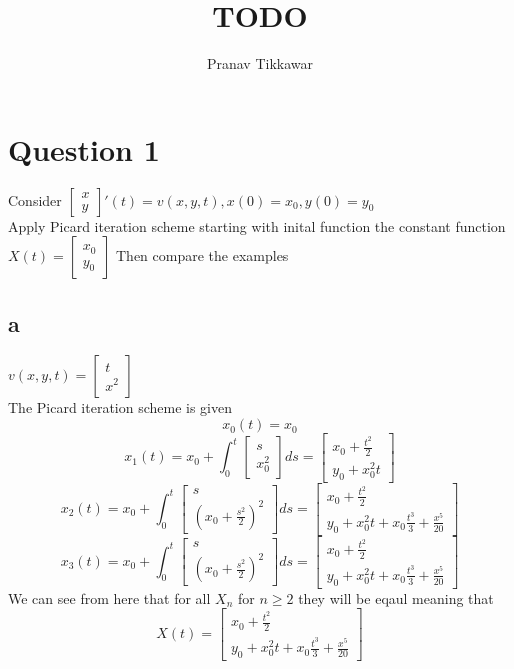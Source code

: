 \documentclass{article}
\author{Pranav Tikkawar}
\title{TODO}
\begin{document}
\maketitle
\section*{Question 1}
Consider $\begin{bmatrix}
    x \\
    y
\end{bmatrix}'(t) = v(x,y,t), x(0)=x_0, y(0) = y_0$ \\
Apply Picard iteration scheme starting with inital function the constant function $X(t) = \begin{bmatrix}
    x_0 \\
    y_0
\end{bmatrix}$ Then compare the examples
\subsection*{a}
$v(x,y,t) = \begin{bmatrix}
    t\\
    x^2
\end{bmatrix}$\\
The Picard iteration scheme is given 
$$x_0(t) = x_0$$
$$x_1(t) = x_0 + \int_0^t \begin{bmatrix}
    s\\
    x_0^2
\end{bmatrix} ds = \begin{bmatrix}
    x_0 + \frac{t^2}{2} \\
    y_0 + x_0^2t
\end{bmatrix}$$
$$x_2(t) = x_0 + \int_0^t \begin{bmatrix}
    s \\
    (x_0 + \frac{s^2}{2})^2
\end{bmatrix} ds = \begin{bmatrix}
    x_0 + \frac{t^2}{2} \\
    y_0 + x_0^2t + x_0\frac{t^3}{3} + \frac{x^5}{20}
\end{bmatrix}$$
$$x_3(t) = x_0 + \int_0^t \begin{bmatrix}
    s \\
    (x_0 + \frac{s^2}{2})^2
\end{bmatrix} ds = \begin{bmatrix}
    x_0 + \frac{t^2}{2} \\
    y_0 + x_0^2t + x_0\frac{t^3}{3} + \frac{x^5}{20}
\end{bmatrix}$$
We can see from here that for all $X_n$ for $n \geq 2$ they will be eqaul meaning that $$X(t) = \begin{bmatrix}
    x_0 + \frac{t^2}{2} \\
    y_0 + x_0^2t + x_0\frac{t^3}{3} + \frac{x^5}{20}
\end{bmatrix}$$
\end{document}
